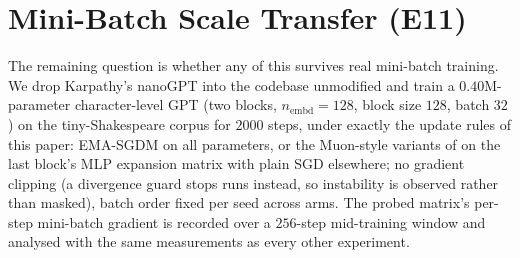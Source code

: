 \documentclass[11pt,a4paper]{article}
\theoremstyle{remark}
\begin{document}
\section{Mini-Batch Scale Transfer (E11)}
\label{sec:scale}

The remaining question is whether any of this survives real mini-batch training.
We drop Karpathy's nanoGPT into the codebase unmodified and train a $0.40$M-parameter character-level GPT (two blocks, $n_{\mathrm{embd}}=128$, block size $128$, batch $32$) on the tiny-Shakespeare corpus for $2000$ steps, under exactly the update rules of this paper: EMA-SGDM on all parameters, or the Muon-style variants of  on the last block's MLP expansion matrix with plain SGD elsewhere; no gradient clipping (a divergence guard stops runs instead, so instability is observed rather than masked), batch order fixed per seed across arms.
The probed matrix's per-step mini-batch gradient is recorded over a $256$-step mid-training window and analysed with the same measurements as every other experiment.
\end{document}
